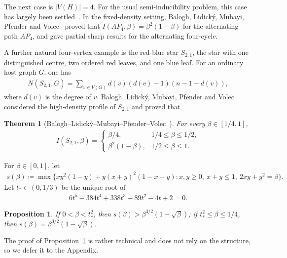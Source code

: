 \documentclass[10pt,a4paper]{article}
\newtheorem{theorem}[definition]{Theorem}
\newtheorem{proposition}[definition]{Proposition}
\begin{document}



The next case is $|V(H)|=4$. For the usual semi-inducibility problem, this
case has largely been settled~\cite{BGHKS,BodnarPikhurkoSemi2025}. In the
fixed-density setting, Balogh, Lidick\'y, Mubayi, Pfender and
Volec~\cite{BLMPV} proved that
$I(AP_4,\beta)=\beta^2(1-\beta)$ for the alternating path $AP_4$, and gave
partial sharp results for the alternating four-cycle.

A further natural four-vertex example is the red-blue star $S_{2,1}$, the
star with one distinguished centre, two ordered red leaves, and one blue leaf.
For an ordinary host graph $G$, one has
\begin{align}\label{EQ:number-S2,1-degree}
N(S_{2,1},G)
=
\sum_{v\in V(G)} d(v)(d(v)-1)(n-1-d(v)),
\end{align}
where $d(v)$ is the degree of $v$. Balogh, Lidick\'y, Mubayi, Pfender and
Volec~\cite{BLMPV} considered the high-density profile of $S_{2,1}$ and
proved that

\begin{theorem}[Balogh--Lidick\'y--Mubayi--Pfender--Volec~\cite{BLMPV}]\label{thm:dense-upper-profile}
    For every $\beta\in[1/4,1]$,
    \begin{align*}
        I(S_{2,1},\beta)=
        \begin{cases}
        \beta/4, & 1/4\le \beta\le 1/2,\\[1mm]
        \beta^2(1-\beta), & 1/2\le \beta\le 1.
        \end{cases}
\end{align*}
\end{theorem}
For $\beta\in [0,1]$, let 
\begin{align*}
        s(\beta)\coloneqq
        \max\{xy^2(1-y)+y(x+y)^2(1-x-y):
        x,y\ge0,\ x+y\le1,\ 2xy+y^2=\beta\}.
\end{align*}
Let $t_*\in(0,1/3)$ be the unique root of
\begin{align}\label{eq:switching-equation}
        6t^5-384t^4+338t^3-89t^2-4t+2=0.
\end{align}


\begin{proposition}\label{lem:split-quasiclique-comparison}
If $0<\beta<t_*^2$, then $s(\beta)>\beta^{3/2}(1-\sqrt{\beta})$; if $t_*^2\le \beta\le 1/4$, then 
$s(\beta)=\beta^{3/2}(1-\sqrt{\beta})$.
\end{proposition}

The proof of Proposition~\ref{lem:split-quasiclique-comparison} is rather technical and does not rely on the structure, so we defer it to the Appendix.
\end{document}

